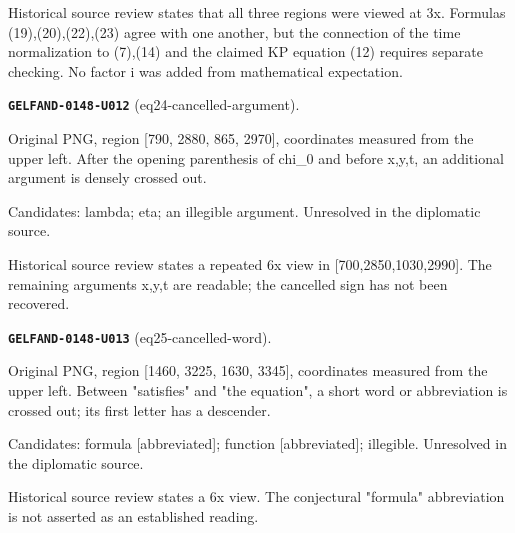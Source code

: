 \documentclass[11pt]{article}
\theoremstyle{definition}
\theoremstyle{remark}
\begin{document}
Historical source review states that all three regions were viewed at 3x. Formulas (19),(20),(22),(23) agree with one another, but the connection of the time normalization to (7),(14) and the claimed KP equation (12) requires separate checking. No factor i was added from mathematical expectation.\par\medskip
\noindent\leavevmode{}\label{GELFAND-P001361:eq24-cancelled-argument:note}\textbf{\texttt{GELFAND-0148-U012}} (eq24-cancelled-argument).\par\nopagebreak[4]
Original PNG, region [790, 2880, 865, 2970], coordinates measured from the upper left. After the opening parenthesis of chi\_0 and before x,y,t, an additional argument is densely crossed out.\par
Candidates: lambda; eta; an illegible argument. Unresolved in the diplomatic source.\par
Historical source review states a repeated 6x view in [700,2850,1030,2990]. The remaining arguments x,y,t are readable; the cancelled sign has not been recovered.\par\medskip
\noindent\leavevmode{}\label{GELFAND-P001361:eq25-cancelled-word:note}\textbf{\texttt{GELFAND-0148-U013}} (eq25-cancelled-word).\par\nopagebreak[4]
Original PNG, region [1460, 3225, 1630, 3345], coordinates measured from the upper left. Between "satisfies" and "the equation", a short word or abbreviation is crossed out; its first letter has a descender.\par
Candidates: formula [abbreviated]; function [abbreviated]; illegible. Unresolved in the diplomatic source.\par
Historical source review states a 6x view. The conjectural "formula" abbreviation is not asserted as an established reading.\par\medskip
\end{document}
